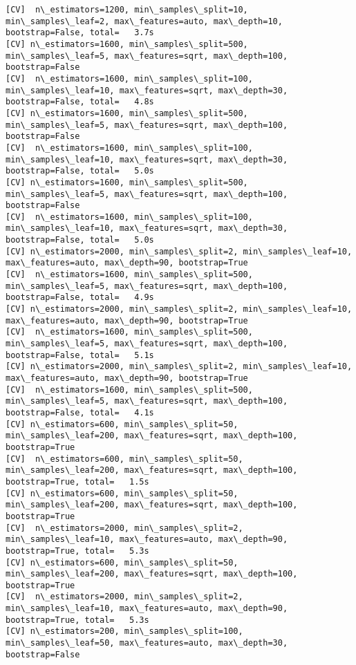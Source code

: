 \documentclass[11pt]{article}
\begin{document}
\begin{Verbatim}[commandchars=\\\{\}]
[CV]  n\_estimators=1200, min\_samples\_split=10, min\_samples\_leaf=2, max\_features=auto, max\_depth=10, bootstrap=False, total=   3.7s
[CV] n\_estimators=1600, min\_samples\_split=500, min\_samples\_leaf=5, max\_features=sqrt, max\_depth=100, bootstrap=False 
[CV]  n\_estimators=1600, min\_samples\_split=100, min\_samples\_leaf=10, max\_features=sqrt, max\_depth=30, bootstrap=False, total=   4.8s
[CV] n\_estimators=1600, min\_samples\_split=500, min\_samples\_leaf=5, max\_features=sqrt, max\_depth=100, bootstrap=False 
[CV]  n\_estimators=1600, min\_samples\_split=100, min\_samples\_leaf=10, max\_features=sqrt, max\_depth=30, bootstrap=False, total=   5.0s
[CV] n\_estimators=1600, min\_samples\_split=500, min\_samples\_leaf=5, max\_features=sqrt, max\_depth=100, bootstrap=False 
[CV]  n\_estimators=1600, min\_samples\_split=100, min\_samples\_leaf=10, max\_features=sqrt, max\_depth=30, bootstrap=False, total=   5.0s
[CV] n\_estimators=2000, min\_samples\_split=2, min\_samples\_leaf=10, max\_features=auto, max\_depth=90, bootstrap=True 
[CV]  n\_estimators=1600, min\_samples\_split=500, min\_samples\_leaf=5, max\_features=sqrt, max\_depth=100, bootstrap=False, total=   4.9s
[CV] n\_estimators=2000, min\_samples\_split=2, min\_samples\_leaf=10, max\_features=auto, max\_depth=90, bootstrap=True 
[CV]  n\_estimators=1600, min\_samples\_split=500, min\_samples\_leaf=5, max\_features=sqrt, max\_depth=100, bootstrap=False, total=   5.1s
[CV] n\_estimators=2000, min\_samples\_split=2, min\_samples\_leaf=10, max\_features=auto, max\_depth=90, bootstrap=True 
[CV]  n\_estimators=1600, min\_samples\_split=500, min\_samples\_leaf=5, max\_features=sqrt, max\_depth=100, bootstrap=False, total=   4.1s
[CV] n\_estimators=600, min\_samples\_split=50, min\_samples\_leaf=200, max\_features=sqrt, max\_depth=100, bootstrap=True 
[CV]  n\_estimators=600, min\_samples\_split=50, min\_samples\_leaf=200, max\_features=sqrt, max\_depth=100, bootstrap=True, total=   1.5s
[CV] n\_estimators=600, min\_samples\_split=50, min\_samples\_leaf=200, max\_features=sqrt, max\_depth=100, bootstrap=True 
[CV]  n\_estimators=2000, min\_samples\_split=2, min\_samples\_leaf=10, max\_features=auto, max\_depth=90, bootstrap=True, total=   5.3s
[CV] n\_estimators=600, min\_samples\_split=50, min\_samples\_leaf=200, max\_features=sqrt, max\_depth=100, bootstrap=True 
[CV]  n\_estimators=2000, min\_samples\_split=2, min\_samples\_leaf=10, max\_features=auto, max\_depth=90, bootstrap=True, total=   5.3s
[CV] n\_estimators=200, min\_samples\_split=100, min\_samples\_leaf=50, max\_features=auto, max\_depth=30, bootstrap=False 

\end{Verbatim}
\end{document}
